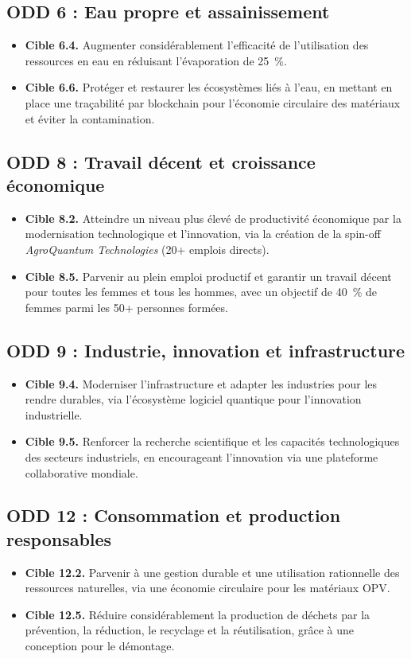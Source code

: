 \documentclass[12pt, a4paper]{article}
\begin{document}
\subsection{ODD 6 : Eau propre et assainissement}
\begin{itemize}
    \item \textbf{Cible 6.4.} Augmenter considérablement l'efficacité de l'utilisation des ressources en eau en réduisant l'évaporation de \SI{25}{\percent}.
    \item \textbf{Cible 6.6.} Protéger et restaurer les écosystèmes liés à l'eau, en mettant en place une traçabilité par blockchain pour l'économie circulaire des matériaux et éviter la contamination.
\end{itemize}

\subsection{ODD 8 : Travail décent et croissance économique}
\begin{itemize}
    \item \textbf{Cible 8.2.} Atteindre un niveau plus élevé de productivité économique par la modernisation technologique et l'innovation, via la création de la spin-off \textit{AgroQuantum Technologies} (\num{20}+ emplois directs).
    \item \textbf{Cible 8.5.} Parvenir au plein emploi productif et garantir un travail décent pour toutes les femmes et tous les hommes, avec un objectif de \SI{40}{\percent} de femmes parmi les \num{50}+ personnes formées.
\end{itemize}

\subsection{ODD 9 : Industrie, innovation et infrastructure}
\begin{itemize}
    \item \textbf{Cible 9.4.} Moderniser l'infrastructure et adapter les industries pour les rendre durables, via l'écosystème logiciel quantique pour l'innovation industrielle.
    \item \textbf{Cible 9.5.} Renforcer la recherche scientifique et les capacités technologiques des secteurs industriels, en encourageant l'innovation via une plateforme collaborative mondiale.
\end{itemize}

\subsection{ODD 12 : Consommation et production responsables}
\begin{itemize}
    \item \textbf{Cible 12.2.} Parvenir à une gestion durable et une utilisation rationnelle des ressources naturelles, via une économie circulaire pour les matériaux OPV.
    \item \textbf{Cible 12.5.} Réduire considérablement la production de déchets par la prévention, la réduction, le recyclage et la réutilisation, grâce à une conception pour le démontage.
\end{itemize}
\end{document}

